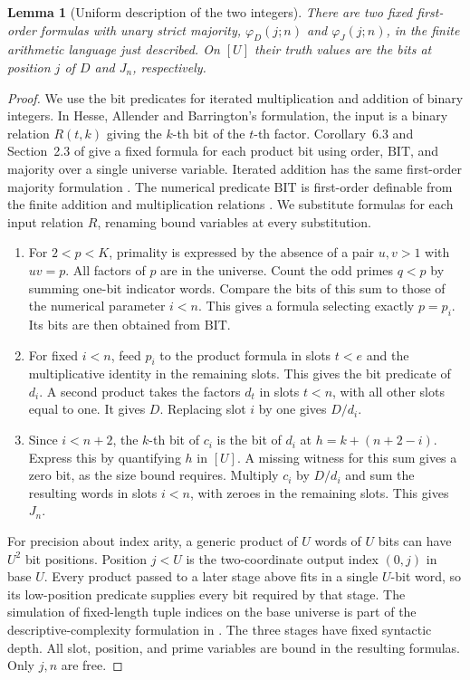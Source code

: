 \documentclass[11pt,letterpaper]{article}
\newtheorem{lemma}[theorem]{Lemma}
\numberwithin{equation}{section}
\begin{document}
\begin{lemma}[Uniform description of the two integers]\label{lem:width-formulas}
There are two fixed first-order formulas with unary strict majority,
\(\varphi_D(j;n)\) and \(\varphi_J(j;n)\), in the finite arithmetic
language just described. On \([U]\) their truth values are the bits at
position \(j\) of \(D\) and \(J_n\), respectively.
\end{lemma}
\begin{proof}
We use the bit predicates for iterated multiplication and addition of
binary integers. In Hesse, Allender and Barrington's formulation, the
input is a binary relation \(R(t,k)\) giving the \(k\)-th bit of the
\(t\)-th factor. Corollary~6.3 and Section~2.3 of \cite{hab} give a fixed
formula for each product bit using order, \(\mathrm{BIT}\), and majority
over a single universe variable. Iterated addition has the same
first-order majority formulation \cite[proof of Lemma~4.1]{hab}.
The numerical predicate \(\mathrm{BIT}\) is first-order definable from
the finite addition and multiplication relations
\cite[Cor.~6.15]{libkin}. We substitute formulas for each input
relation \(R\), renaming bound variables at every substitution.

\begin{enumerate}
\item For \(2<p<K\), primality is expressed by the absence of
      a pair \(u,v>1\) with \(uv=p\). All factors of \(p\) are in the universe.
      Count the odd primes \(q<p\) by summing one-bit indicator words.
      Compare the bits of this sum to those of the numerical parameter
      \(i<n\). This gives a formula selecting exactly \(p=p_i\). Its bits are then obtained from \(\mathrm{BIT}\).
\item For fixed \(i<n\), feed \(p_i\) to the product formula in slots
      \(t<e\) and the multiplicative identity in the remaining slots.
      This gives the bit predicate of \(d_i\). A second product takes
      the factors \(d_t\) in slots \(t<n\), with all other slots equal
      to one. It gives \(D\). Replacing slot \(i\) by one gives \(D/d_i\).
\item Since \(i<n+2\), the \(k\)-th bit of \(c_i\) is the bit of \(d_i\)
      at \(h=k+(n+2-i)\). Express this by quantifying \(h\) in \([U]\). A missing witness for this sum gives a zero bit, as the size bound requires.
      Multiply \(c_i\) by \(D/d_i\) and sum the resulting words in
      slots \(i<n\), with zeroes in the remaining slots. This gives \(J_n\).
\end{enumerate}

For precision about index arity, a generic product of \(U\) words of
\(U\) bits can have \(U^2\) bit positions. Position \(j<U\) is the
two-coordinate output index \((0,j)\) in base \(U\). Every product
passed to a later stage above fits in a single \(U\)-bit word, so its
low-position predicate supplies every bit required by that stage.
The simulation of fixed-length tuple indices on the base universe is
part of the descriptive-complexity formulation in \cite[Section~2.3]{hab}.
The three stages have fixed syntactic depth. All slot, position, and
prime variables are bound in the resulting formulas. Only \(j,n\) are
free.
\end{proof}
\end{document}
